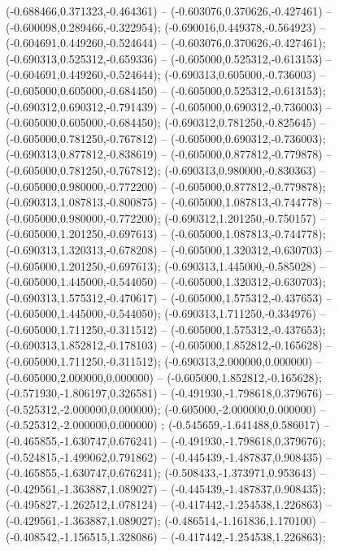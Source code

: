  (-0.688466,0.371323,-0.464361) -- (-0.603076,0.370626,-0.427461) -- (-0.600098,0.289466,-0.322954);
 (-0.690016,0.449378,-0.564923) -- (-0.604691,0.449260,-0.524644) -- (-0.603076,0.370626,-0.427461);
 (-0.690313,0.525312,-0.659336) -- (-0.605000,0.525312,-0.613153) -- (-0.604691,0.449260,-0.524644);
 (-0.690313,0.605000,-0.736003) -- (-0.605000,0.605000,-0.684450) -- (-0.605000,0.525312,-0.613153);
 (-0.690312,0.690312,-0.791439) -- (-0.605000,0.690312,-0.736003) -- (-0.605000,0.605000,-0.684450);
 (-0.690312,0.781250,-0.825645) -- (-0.605000,0.781250,-0.767812) -- (-0.605000,0.690312,-0.736003);
 (-0.690313,0.877812,-0.838619) -- (-0.605000,0.877812,-0.779878) -- (-0.605000,0.781250,-0.767812);
 (-0.690313,0.980000,-0.830363) -- (-0.605000,0.980000,-0.772200) -- (-0.605000,0.877812,-0.779878);
 (-0.690313,1.087813,-0.800875) -- (-0.605000,1.087813,-0.744778) -- (-0.605000,0.980000,-0.772200);
 (-0.690312,1.201250,-0.750157) -- (-0.605000,1.201250,-0.697613) -- (-0.605000,1.087813,-0.744778);
 (-0.690313,1.320313,-0.678208) -- (-0.605000,1.320312,-0.630703) -- (-0.605000,1.201250,-0.697613);
 (-0.690313,1.445000,-0.585028) -- (-0.605000,1.445000,-0.544050) -- (-0.605000,1.320312,-0.630703);
 (-0.690313,1.575312,-0.470617) -- (-0.605000,1.575312,-0.437653) -- (-0.605000,1.445000,-0.544050);
 (-0.690313,1.711250,-0.334976) -- (-0.605000,1.711250,-0.311512) -- (-0.605000,1.575312,-0.437653);
 (-0.690313,1.852812,-0.178103) -- (-0.605000,1.852812,-0.165628) -- (-0.605000,1.711250,-0.311512);
 (-0.690313,2.000000,0.000000) -- (-0.605000,2.000000,0.000000) -- (-0.605000,1.852812,-0.165628);
 (-0.571930,-1.806197,0.326581) -- (-0.491930,-1.798618,0.379676) -- (-0.525312,-2.000000,0.000000);
 (-0.605000,-2.000000,0.000000) -- (-0.525312,-2.000000,0.000000) ;
 (-0.545659,-1.641488,0.586017) -- (-0.465855,-1.630747,0.676241) -- (-0.491930,-1.798618,0.379676);
 (-0.524815,-1.499062,0.791862) -- (-0.445439,-1.487837,0.908435) -- (-0.465855,-1.630747,0.676241);
 (-0.508433,-1.373971,0.953643) -- (-0.429561,-1.363887,1.089027) -- (-0.445439,-1.487837,0.908435);
 (-0.495827,-1.262512,1.078124) -- (-0.417442,-1.254538,1.226863) -- (-0.429561,-1.363887,1.089027);
 (-0.486514,-1.161836,1.170100) -- (-0.408542,-1.156515,1.328086) -- (-0.417442,-1.254538,1.226863);
